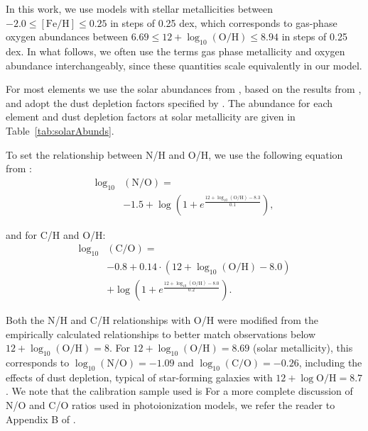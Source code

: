 \documentclass[trackchanges, preprint2]{aastex62}
\newcommand{\logten}{\ensuremath{\log_{10}}}
\newcommand{\logOH}{\ensuremath{\logten (\mathrm{O}/\mathrm{H})}\xspace}
\begin{document}
In this work, we use models with stellar metallicities between $-2.0 \leq [\mathrm{Fe}/\mathrm{H}] \leq 0.25$ in steps of 0.25 dex, which corresponds to gas-phase oxygen abundances between $6.69 \leq 12+\logOH \leq 8.94$ in steps of 0.25 dex. In what follows, we often use the terms gas phase metallicity and oxygen abundance interchangeably, since these quantities scale equivalently in our model. 

For most elements we use the solar abundances from \citet{Grevesse+2010}, based on the results from \citet{Asplund+2009}, and adopt the dust depletion factors specified by \citet{Dopita+2013}. The abundance for each element and dust depletion factors at solar metallicity are given in Table~\ref{tab:solarAbunds}. 

To set the relationship between N/H and O/H, we use the following equation from :
\begin{equation}\label{eq:nitrogen}
\begin{aligned}
    \log_{10}&(\mathrm{N}/\mathrm{O}) = \\
    & -1.5 + \log\left( 1 + e^{\frac{12 + \log_{10}(\mathrm{O}/\mathrm{H})-8.3}{0.1}}\right),
\end{aligned}
\end{equation}

and for C/H and O/H:
\begin{equation}\label{eq:carbon}
\begin{aligned}
    \log_{10}&(\mathrm{C}/\mathrm{O}) = \\
    & -0.8 + 0.14\cdot\left(12 + \log_{10}(\mathrm{O}/\mathrm{H})-8.0\right) \\
    & + \log\left( 1 + e^{\frac{12 + \log_{10}(\mathrm{O}/\mathrm{H})-8.0}{0.2}}\right).
\end{aligned}
\end{equation}

\noindent Both the N/H and C/H relationships with O/H were modified from the empirically calculated \citet{Dopita+2013} relationships to better match observations below $12+\logOH = 8$. For $12+\log_{10} (\mathrm{O}/\mathrm{H}) = 8.69$ (solar metallicity), this corresponds to $\log_{10} (\mathrm{N}/\mathrm{O}) = -1.09$ and $\log_{10} (\mathrm{C}/\mathrm{O}) = -0.26$, including the effects of dust depletion, typical of star-forming galaxies with $12 + \log \mathrm{O}/\mathrm{H} = 8.7$ \citep[e.g.,][]{Belfiore+2017b}. We note that the calibration sample used is For a more complete discussion of N/O and C/O ratios used in photoionization models, we refer the reader to Appendix B of . 
\end{document}
